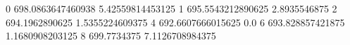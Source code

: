 0 698.0863647460938 5.42559814453125
1 695.5543212890625 2.8935546875
2 694.1962890625 1.5355224609375
4 692.6607666015625 0.0
6 693.828857421875 1.1680908203125
8 699.7734375 7.1126708984375
